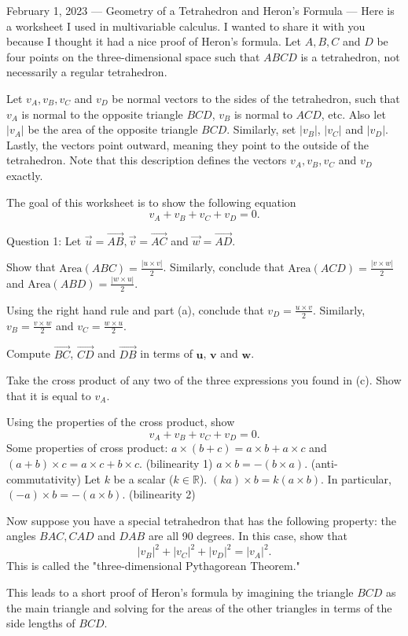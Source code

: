 February 1, 2023
---
Geometry of a Tetrahedron and Heron's Formula
---
Here is a worksheet I used in multivariable calculus. I wanted to share it with you because I thought it had a nice proof of Heron's formula.
Let $A,B,C$ and $D$ be four points on the three-dimensional space such that $ABCD$ is a tetrahedron, not necessarily a regular tetrahedron.

Let  $v_A, v_B, v_C$ and $v_D$ be normal vectors to the sides of the tetrahedron, such that $v_A$ is normal to the opposite triangle $BCD$, $v_B$ is normal to $ACD$, etc. Also let $|v_A|$ be the area of the opposite triangle $BCD$. Similarly, set $|v_B|$, $|v_C|$ and $|v_D|$. Lastly, the vectors point outward, meaning they point to the outside of the tetrahedron. Note that this description defines the vectors $v_A, v_B, v_C$ and $v_D$ exactly.

The goal of this worksheet is to show the following equation $$v_A+v_B+v_C+v_D = 0.$$ 

Question 1: Let $\overset{\rightarrow}{u} = \overset{\rightarrow}{AB}, \overset{\rightarrow}{v} = \overset{\rightarrow}{AC}$ and $\overset{\rightarrow}{w} = \overset{\rightarrow}{AD}.$ 

Show that $\textrm{Area}(ABC) = \frac{|u\times v|}{2}$. Similarly, conclude that $\textrm{Area}(ACD) = \frac{|v\times w|}{2}$ and $\textrm{Area}(ABD) = \frac{|w\times u|}{2}$. 

Using the right hand rule and part (a), conclude that $v_D = \frac{u\times v}{2}$. Similarly, $v_B = \frac{v\times w}{2}$ and $v_C = \frac{w\times u}{2}$. 

Compute $\overset{\rightarrow}{BC}$, $\overset{\rightarrow}{CD}$ and $\overset{\rightarrow}{DB}$ in terms of $\textbf{u}$, $\textbf{v}$ and $\textbf{w}$. 

Take the cross product of any two of the three expressions you found in (c). Show that it is equal to $v_A.$

Using the properties of the cross product, show $$v_A + v_B + v_C + v_D = 0.$$ Some properties of cross product:
$a\times (b+c) = a\times b + a\times c$ and $(a+b) \times c = a\times c + b\times c.$ (bilinearity 1) 
$a\times b = - (b\times a).$ (anti-commutativity)
Let $k$ be a scalar ($k\in \mathbb{R}$). $(ka) \times b = k(a\times b).$ In particular, $(-a)\times b = -(a\times b).$ (bilinearity 2)

Now suppose you have a special tetrahedron that has the following property: the angles $BAC, CAD$ and $DAB$ are all 90 degrees. In this case, show that $$|v_B|^2+|v_C|^2+|v_D|^2 = |v_A|^2.$$ This is called the "three-dimensional Pythagorean Theorem."

This leads to a short proof of Heron's formula by imagining the triangle $BCD$ as the main triangle and solving for the areas of the other triangles in terms of the side lengths of $BCD$.
